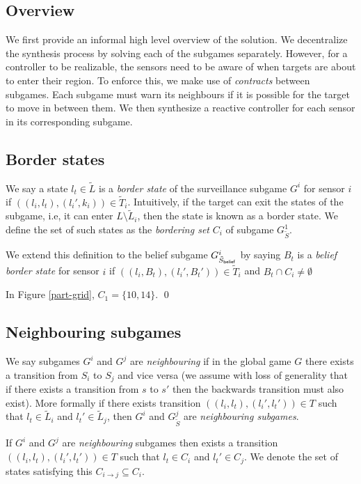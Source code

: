 \subsection{Overview}
We first provide an informal high level overview of the solution. We decentralize the synthesis process by solving each of the subgames separately. However, for a controller to be realizable, the sensors need to be aware of when targets are about to enter their region. To enforce this, we make use of \emph{contracts} between subgames. Each subgame must warn its neighbours if it is possible for the target to move in between them. We then synthesize a reactive controller for each sensor in its corresponding subgame. 

\subsection{Border states}
We say a state $l_t \in \widetilde{L}$ is a \emph{border state} of the surveillance subgame $G^i$ for sensor $i$ if $((l_i,l_t),(l_i',k_i)) \in \widetilde{T}_i$. Intuitively, if the target can exit the states of the subgame, i.e, it can enter $L\setminus\widetilde{L}_i$, then the state is known as a border state. We define the set of such states as the \emph{bordering set} $C_i$ of subgame $G^1_{\tilde{S}}$. 

We extend this definition to the belief subgame $G^i_{\tilde{S}_{\mathsf{belief}}}$ by saying $B_t$ is a \emph{belief border state} for sensor $i$ if $((l_i,B_t),(l_i',B_t')) \in \widetilde{T}_i$ and $B_t \cap C_i \neq \emptyset$ 

\begin{example}
In Figure \ref{part-grid}, $C_1 = \{10,14\}$. \qed
\end{example}

\subsection{Neighbouring subgames}
We say subgames $G^i$ and $G^j$ are \emph{neighbouring} if in the global game $G$ there exists a transition from $S_i$ to $S_j$ and vice versa (we assume with loss of generality that if there exists a transition from $s$ to $s'$ then the backwards transition must also exist). More formally if there exists transition $((l_i,l_t),(l_i',l_t')) \in T$ such that $l_t \in \widetilde{L}_i$ and $l_t' \in \widetilde{L}_j$, then $G^i$ and $G^j_{\tilde{S}}$ are \emph{neighbouring subgames}.

\begin{proposition}
If $G^i$ and $G^j$ are \emph{neighbouring} subgames then exists a transition $((l_i,l_t),(l_i',l_t')) \in T$ such that $l_t \in C_i$ and $l_t' \in C_j$. We denote the set of states satisfying this $C_{i \rightarrow j} \subseteq C_i$.
\end{proposition}

